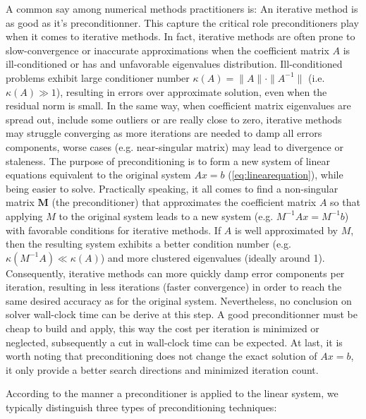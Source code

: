 A common say among numerical methods practitioners is: An iterative method is as good as it's preconditionner. This capture the critical role preconditioners play when it comes to iterative methods. In fact, iterative methods are often prone to slow-convergence or inaccurate approximations when the coefficient matrix $A$ is ill-conditioned or has and unfavorable eigenvalues distribution. Ill-conditioned problems exhibit large conditioner number $\kappa(A)=\|A\|\cdot \|A^{-1}\|$ (i.e. $\kappa(A) \gg 1$), resulting in errors over approximate solution, even when the residual norm is small. In the same way, when coefficient matrix eigenvalues are spread out, include some outliers or are really close to zero, iterative methods may struggle converging as more iterations are needed to damp all errors components, worse cases (e.g. near-singular matrix) may lead to divergence or staleness. The purpose of preconditioning is to form a new system of linear equations equivalent to the original system $Ax=b$ (\ref{eq:linearequation}), while being easier to solve. Practically speaking, it all comes to find a non-singular matrix $\mathbf{M}$ (the preconditioner) that approximates the coefficient matrix $A$ so that applying $M$ to the original system leads to a new system (e.g. $M^{-1}Ax=M^{-1}b$) with favorable conditions for iterative methods. If $A$ is well approximated by $M$, then the resulting system exhibits a better condition number (e.g. $\kappa(M^{-1}A) \ll \kappa(A)$) and more clustered eigenvalues (ideally around 1). Consequently, iterative methods can more quickly damp error components per iteration, resulting in less iterations (faster convergence) in order to reach the same desired accuracy as for the original system. Nevertheless, no conclusion on solver wall-clock time can be derive at this step. A good preconditionner must be cheap to build and apply, this way the cost per iteration is minimized or neglected, subsequently a cut in wall-clock time can be expected. At last, it is worth noting that preconditioning does not change the exact solution of $Ax=b$, it only provide a better search directions and minimized iteration count.

According to the manner a preconditioner is applied to the linear system, we typically distinguish three types of preconditioning techniques:


